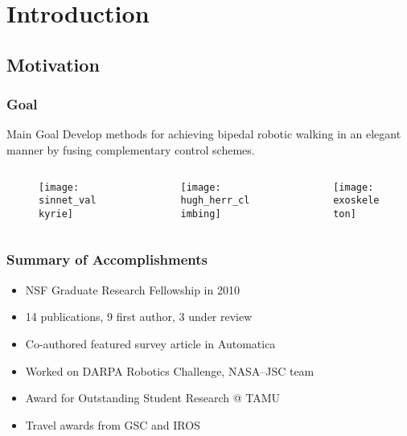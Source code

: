 \section{Introduction}
\showtoc

\subsection{Motivation}

\begin{frame}[t]
  \frametitle{Goal}
  \begin{block}{Main Goal}
    Develop methods for achieving bipedal robotic walking in an elegant manner by fusing complementary control schemes.
  \end{block}
    \begin{columns}
    \begin{column}{.333\textwidth}
      \begin{figure}
        \centering
        \texttt{[image: sinnet\_valkyrie]}
      \end{figure}
    \end{column}
    \begin{column}{.333\textwidth}
      \begin{figure}
        \centering
        \texttt{[image: hugh\_herr\_climbing]}
      \end{figure}
    \end{column}
    \begin{column}{.333\textwidth}
      \begin{figure}
        \centering
        \texttt{[image: exoskeleton]}
      \end{figure}
    \end{column}
  \end{columns}
\end{frame}

\begin{frame}[t]
  \frametitle{Summary of Accomplishments}
  \begin{itemize}
  \item NSF Graduate Research Fellowship in 2010
  \item 14 publications, 9 first author, 3 under review
  \item Co-authored featured survey article in Automatica
  \item Worked on DARPA Robotics Challenge, NASA--JSC team
  \item Award for Outstanding Student Research @ TAMU
  \item Travel awards from GSC and IROS
  \end{itemize}
\end{frame}

